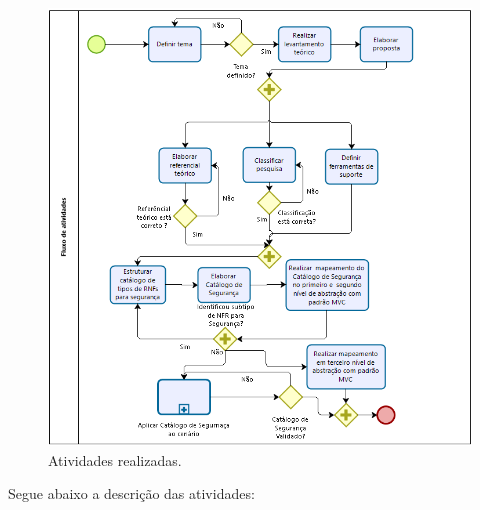 \begin{figure}[h!]
	\centering
	\includegraphics[keepaspectratio=true,scale=0.8]{figuras/fluxodeatividades.PNG}
	\caption{Atividades realizadas.}
	\label{fluxoDeExecuçãoTCC}
\end{figure}

Segue abaixo a descrição das atividades:

